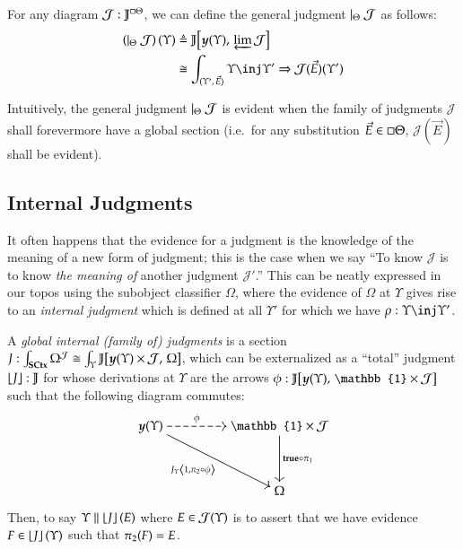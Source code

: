 \documentclass[11pt]{article}
\theoremstyle{definition}
\theoremstyle{remark}
\numberwithin{equation}{section}
\def\IModeColorName{MidnightBlue}
\def\OModeColorName{Maroon}
\def\IModeColorName{Black}
\def\OModeColorName{Black}
\newcommand\IMode[1]{{\color{\IModeColorName}{#1}}}
\newcommand\OMode[1]{{\color{\OModeColorName}{#1}}}
\newcommand\GenJ[2]{\vert_{\IMode{#1}}\; #2}
\newcommand\Member[2]{\IMode{#1}\in\IMode{#2}}
\newcommand\Of[2]{\IMode{#1}: \IMode{#2}}
\newcommand\SCtx{\mathbf{SCtx}}
\newcommand\Pair[2]{\left\langle#1, #2 \right\rangle}
\newcommand\Hom[3]{#1\!\left[#2,\,#3\right]}
\newcommand\IsEq[2]{\IMode{#1} = \IMode{#2}}
\newcommand\ADefine[2]{\IMode{#1}&\triangleq\OMode{#2}}
\newcommand\Embed[1]{\left\lfloor#1\right\rfloor}
\newcommand\Yoneda[1]{\boldsymbol{y} (#1)}
\begin{document}
\begin{appendices}
For any diagram $\Of{\mathcal{J}}{\mathbb{J}^{\square\Theta}}$, we can define
the general judgment $\GenJ{\Theta}{\mathcal{J}}$ as follows:
\begin{align*}
  \ADefine{
    \left(\GenJ{\Theta}{\mathcal{J}}\right)(\Upsilon)
  }{
    \Hom{\mathbb{J}}{
      \Yoneda{\Upsilon}
    }{
      \varprojlim\mathcal{J}
    }
  }\\
  &\cong
  \OMode{
    \int_{(\Upsilon',\,\vec{E})}{\Upsilon\inj\Upsilon'\Rightarrow{\mathcal{J}(\vec{E})(\Upsilon')}}
  }
\end{align*}

 Intuitively, the general judgment $\GenJ{\Theta}{\mathcal{J}}$ is evident
 when the family of judgments $\mathcal{J}$ shall forevermore have a global
 section (i.e.\ for any substitution $\Member{\vec{E}}{\square\Theta}$,
 $\mathcal{J}(\vec{E})$ shall be evident).


\subsection{Internal Judgments}
It often happens that the evidence for a judgment is the knowledge of the
meaning of a new form of judgment; this is the case when we say ``To know
$\mathcal{J}$ is to know \emph{the meaning of} another judgment
$\mathcal{J}'$.'' This can be neatly expressed in our topos using the subobject
classifier $\Omega$, where the evidence of $\Omega$ at $\Upsilon$ gives rise to
an \emph{internal judgment} which is defined at all $\Upsilon'$ for which we
have $\Of{\rho}{\Upsilon\inj\Upsilon'}$.

A \emph{global internal (family of) judgments} is a section
$\Of{J}{\int_\SCtx {\Omega^{\mathcal{J}}}}\cong
\IMode{\int_\Upsilon\Hom{\mathbb{J}}{\Yoneda{\Upsilon}\times\mathcal{J}}{\Omega}}$,
which can be externalized as a ``total'' judgment $\Of{\Embed{J}}{\mathbb{J}}$
for whose derivations at $\Upsilon$ are the arrows
$\Of{\phi}{\Hom{\mathbb{J}}{\Yoneda{\Upsilon}}{\mathbb{1}\times\mathcal{J}}}$
such that the following diagram commutes:
\[
  \begin{tikzcd}[cramped,sep=huge]
    \IMode{\Yoneda{\Upsilon}}
      \arrow[r, dashed, "\OMode{\phi}"]
      \arrow[rd, "\IMode{J_\Upsilon\Pair{1}{\pi_2\circ\phi}}"']
    & \IMode{\mathbb{1}\times\mathcal{J}} \arrow[d, "\IMode{\mathbf{true}\circ\pi_1}"] \\
    & \IMode{\Omega}
  \end{tikzcd}
\]

Then, to say $\IMode{\Upsilon}\parallel\Embed{J}(E)$ where
$\Member{E}{\mathcal{J}(\Upsilon)}$ is to assert that we have evidence
$\Member{F}{\Embed{J}(\Upsilon)}$ such that $\IsEq{\pi_2(F)}{E}$.



\end{appendices}

\ifdraft{}{
  \newpage
  \nocite{maclane:1971}
  
  
}
\end{document}
